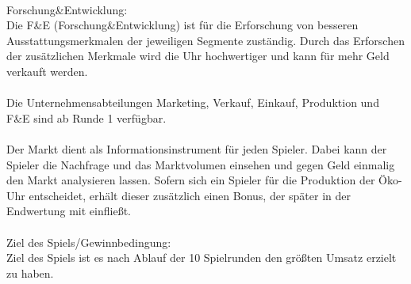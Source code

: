 \\
Forschung\&Entwicklung:\\
Die F\&E (Forschung\&Entwicklung) ist für die Erforschung von besseren Ausstattungsmerkmalen der jeweiligen Segmente zuständig. Durch das Erforschen der zusätzlichen Merkmale wird die Uhr hochwertiger und kann für mehr Geld verkauft werden.\\
\\
Die Unternehmensabteilungen Marketing, Verkauf, Einkauf, Produktion und F\&E sind ab Runde 1 verfügbar.\\
\\
Der Markt dient als Informationsinstrument für jeden Spieler. Dabei kann der Spieler die Nachfrage und das Marktvolumen einsehen und gegen Geld einmalig den Markt analysieren lassen. Sofern sich ein Spieler für die Produktion der Öko-Uhr entscheidet, erhält dieser zusätzlich einen Bonus, der später in der Endwertung mit einfließt.\\ 
\\
Ziel des Spiels/Gewinnbedingung:\\
Ziel des Spiels ist es nach Ablauf der 10 Spielrunden den größten Umsatz erzielt zu haben.


